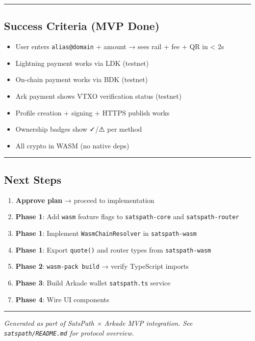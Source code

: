 \documentclass[
]{article}
\providecommand{\tightlist}{%
  \setlength{\itemsep}{0pt}\setlength{\parskip}{0pt}}
\begin{document}
\begin{center}\rule{0.5\linewidth}{0.5pt}\end{center}

\hypertarget{success-criteria-mvp-done}{%
\subsection{Success Criteria (MVP
Done)}\label{success-criteria-mvp-done}}

\begin{itemize}
\tightlist
\item[$\square$]
  User enters \texttt{alias@domain} + amount → sees rail + fee + QR in
  \textless{} 2s
\item[$\square$]
  Lightning payment works via LDK (testnet)
\item[$\square$]
  On-chain payment works via BDK (testnet)
\item[$\square$]
  Ark payment shows VTXO verification status (testnet)
\item[$\square$]
  Profile creation + signing + HTTPS publish works
\item[$\square$]
  Ownership badges show ✓/⚠ per method
\item[$\square$]
  All crypto in WASM (no native deps)
\end{itemize}

\begin{center}\rule{0.5\linewidth}{0.5pt}\end{center}

\hypertarget{next-steps}{%
\subsection{Next Steps}\label{next-steps}}

\begin{enumerate}
\def\labelenumi{\arabic{enumi}.}
\tightlist
\item
  \textbf{Approve plan} → proceed to implementation
\item
  \textbf{Phase 1}: Add \texttt{wasm} feature flags to
  \texttt{satspath-core} and \texttt{satspath-router}
\item
  \textbf{Phase 1}: Implement \texttt{WasmChainResolver} in
  \texttt{satspath-wasm}
\item
  \textbf{Phase 1}: Export \texttt{quote()} and router types from
  \texttt{satspath-wasm}
\item
  \textbf{Phase 2}: \texttt{wasm-pack\ build} → verify TypeScript
  imports
\item
  \textbf{Phase 3}: Build Arkade wallet \texttt{satspath.ts} service
\item
  \textbf{Phase 4}: Wire UI components
\end{enumerate}

\begin{center}\rule{0.5\linewidth}{0.5pt}\end{center}

\emph{Generated as part of SatsPath × Arkade MVP integration. See
\texttt{satspath/README.md} for protocol overview.}
\end{document}
